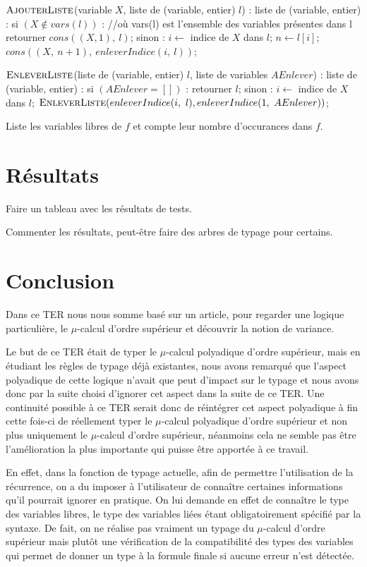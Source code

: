 \documentclass{rapport}
\theoremstyle{plain}
\theoremstyle{remark}
\theoremstyle{definition}
\begin{document}
\begin{algorithm}[H]
\begin{PseudoCode}
$\textsc{AjouterListe}$(variable $X$, liste de (variable, entier) $l$) :
	liste de (variable, entier) :
si $(X \notin vars(l))$ :			//où vars(l) est l'ensemble des variables présentes dans l
    retourner $cons((X, 1),\ l)$;
sinon :
    $i \leftarrow$ indice de $X$ dans $l$;
    $n \leftarrow l[i]$;
    $cons((X,\ n + 1),\ enleverIndice(i,\ l))$;
    
$\textsc{EnleverListe}$(liste de (variable, entier) $l$, liste de variables $AEnlever$) :
	liste de (variable, entier) :
si $(AEnlever = [])$ :
    retourner $l$;
sinon :
    $i \leftarrow$ indice de $X$ dans $l$;
    $\textsc{EnleverListe}(enleverIndice(i,\ l), enleverIndice(1,\ AEnlever))$;
  \end{PseudoCode}
  \caption{Liste les variables libres de $f$ et compte leur nombre d'occurances dans $f$.}
\label{algo:varLibres}
\end{algorithm}

\section{Résultats}

Faire un tableau avec les résultats de tests.

Commenter les résultats, peut-être faire des arbres de typage pour certains.

\section{Conclusion}

Dans ce TER nous nous somme basé sur un article, \citep{lange2014model} pour regarder une logique particulière, le $\mu$-calcul d'ordre supérieur et découvrir la notion de variance.

Le but de ce TER était de typer le $\mu$-calcul polyadique d'ordre supérieur, mais en étudiant les règles de typage déjà existantes, nous avons remarqué que l'aspect polyadique de cette logique n'avait que peut d'impact sur le typage et nous avons donc par la suite choisi d'ignorer cet aspect dans la suite de ce TER. Une continuité possible à ce TER serait donc de réintégrer cet aspect polyadique à fin cette fois-ci de réellement typer le $\mu$-calcul polyadique d'ordre supérieur et non plus uniquement le $\mu$-calcul d'ordre supérieur, néanmoins cela ne semble pas être l'amélioration la plus importante qui puisse être apportée à ce travail. 

En effet, dans la fonction de typage actuelle, afin de permettre l'utilisation de la récurrence, on a du imposer à l'utilisateur de connaître certaines informations qu'il pourrait ignorer en pratique. On lui demande en effet de connaître le type des variables libres, le type des variables liées étant obligatoirement spécifié par la syntaxe. De fait, on ne réalise pas vraiment un typage du $\mu$-calcul d'ordre supérieur mais plutôt une vérification de la compatibilité des types des variables qui permet de donner un type à la formule finale si aucune erreur n'est détectée. 
\end{document}
